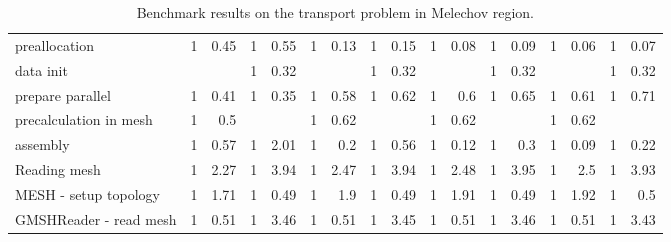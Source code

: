 \begin{sidewaystable}[!htbp]
\begin{tabular}{|l|r|r|r|r|r|r|r|r|r|r|r|r|r|r|r|r|}
   preallocation                     &   1   &   0.45    &   1   &   0.55    &   1   &   0.13    &   1   &   0.15    &   1   &   0.08    &   1   &   0.09    &   1   &   0.06    &   1   &   0.07    \\
   data init                         &       &           &   1   &   0.32    &       &           &   1   &   0.32    &       &           &   1   &   0.32    &       &           &   1   &   0.32    \\
   prepare parallel                  &   1   &   0.41    &   1   &   0.35    &   1   &   0.58    &   1   &   0.62    &   1   &   0.6 &   1   &   0.65    &   1   &   0.61    &   1   &   0.71    \\
   precalculation in mesh            &   1   &   0.5     &       &           &   1   &   0.62    &       &           &   1   &   0.62    &   &           &   1   &   0.62    &       &      \\
   assembly                          &   1   &   0.57    &   1   &   2.01    &   1   &   0.2 &   1   &   0.56    &   1   &   0.12    &   1   &   0.3 &   1   &   0.09    &   1   &   0.22    \\
  Reading mesh                        &   1   &   2.27    &   1   &   3.94    &   1   &   2.47    &   1   &   3.94    &   1   &   2.48    &   1   &   3.95    &   1   &   2.5 &   1   &   3.93    \\
   MESH - setup topology             &   1   &   1.71    &   1   &   0.49    &   1   &   1.9 &   1   &   0.49    &   1   &   1.91    &   1   &   0.49    &   1   &   1.92    &   1   &   0.5 \\
  GMSHReader - read mesh            &   1   &   0.51    &   1   &   3.46    &   1   &   0.51    &   1   &   3.45    &   1   &   0.51    &   1   &   3.46    &   1   &   0.51    &   1   &   3.43    \\
\hline
\end{tabular}
\caption{Benchmark results on the transport problem in Melechov region.}
\label{tab:profiler_Mel1}
\end{sidewaystable}